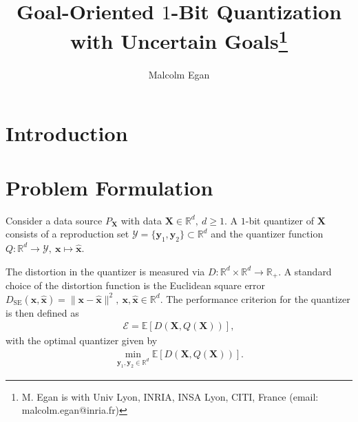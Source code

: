 \documentclass[conference]{IEEEtran}
\begin{document}
	
	\title{Goal-Oriented $1$-Bit Quantization with Uncertain Goals\thanks{M. Egan is with Univ Lyon, INRIA, INSA Lyon, CITI, France (email: malcolm.egan@inria.fr)}}
	

\author{Malcolm Egan}

\maketitle

\begin{abstract}

\end{abstract}


\maketitle

\section{Introduction}



\section{Problem Formulation}

Consider a data source $P_{\mathbf{X}}$ with data $\mathbf{X} \in \mathbb{R}^d,~d \geq 1$. A $1$-bit quantizer of $\mathbf{X}$ consists of a reproduction set $\mathcal{Y} = \{\mathbf{y}_1,\mathbf{y}_2\} \subset \mathbb{R}^d$ and the quantizer function $Q:\mathbb{R}^d \rightarrow \mathcal{Y},~\mathbf{x} \mapsto \hat{\mathbf{x}}$. 

The distortion in the quantizer is measured via $D: \mathbb{R}^d \times \mathbb{R}^d \rightarrow \mathbb{R}_+$. A standard choice of the distortion function is the Euclidean square error $D_{\mathrm{SE}}(\mathbf{x},\hat{\mathbf{x}}) = \|\mathbf{x} - \hat{\mathbf{x}}\|^2,~\mathbf{x},\hat{\mathbf{x}} \in \mathbb{R}^d$. The performance criterion for the quantizer is then defined as 
\begin{align}
\mathcal{E} = \mathbb{E}[D(\mathbf{X},Q(\mathbf{X}))],
\end{align}
with the optimal quantizer given by
\begin{align}\label{eq:opt_expect}
\min_{\mathbf{y}_1,\mathbf{y}_2 \in \mathbb{R}^d} \mathbb{E}[D(\mathbf{X},Q(\mathbf{X}))].
\end{align}
\end{document}
